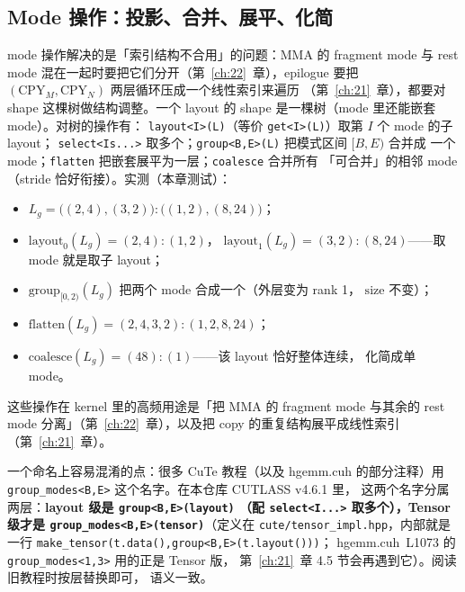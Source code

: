 \subsection{Mode 操作：投影、合并、展平、化简}

mode 操作解决的是「索引结构不合用」的问题：MMA 的 fragment mode 与 rest
mode 混在一起时要把它们分开（第~\ref{ch:22}~章），epilogue 要把
$(\mathrm{CPY}_M,\mathrm{CPY}_N)$ 两层循环压成一个线性索引来遍历
（第~\ref{ch:21}~章），都要对 shape 这棵树做结构调整。一个 layout 的 shape
是一棵树（mode 里还能嵌套 mode）。对树的操作有：
\texttt{layout\allowbreak{}<I>\allowbreak{}(L)}（等价 \texttt{get<I>(L)}）取第 $I$ 个 mode 的子 layout；
\texttt{select\allowbreak{}<Is.\allowbreak{}.\allowbreak{}.\allowbreak{}>} 取多个；\texttt{group\allowbreak{}<B,\allowbreak{}E>\allowbreak{}(L)} 把模式区间 $[B,E)$ 合并成
一个 mode；\texttt{flatten} 把嵌套展平为一层；\texttt{coalesce} 合并所有
「可合并」的相邻 mode（stride 恰好衔接）。实测（本章测试）：
\begin{itemize}
  \item $L_g = \bigl((2,4),(3,2)\bigr){:}\bigl((1,2),(8,24)\bigr)$；
  \item $\mathrm{layout}_0(L_g) = (2,4){:}(1,2)$，
        $\mathrm{layout}_1(L_g) = (3,2){:}(8,24)$——取 mode 就是取子 layout；
  \item $\mathrm{group}_{[0,2)}(L_g)$ 把两个 mode 合成一个（外层变为 rank 1，
        $\mathrm{size}$ 不变）；
  \item $\mathrm{flatten}(L_g) = (2,4,3,2){:}(1,2,8,24)$；
  \item $\mathrm{coalesce}(L_g) = (48){:}(1)$——该 layout 恰好整体连续，
        化简成单 mode。
\end{itemize}
这些操作在 kernel 里的高频用途是「把 MMA 的 fragment mode 与其余的 rest mode
分离」（第~\ref{ch:22}~章），以及把 copy 的重复结构展平成线性索引
（第~\ref{ch:21}~章）。

\begin{sloppypar}
一个命名上容易混淆的点：很多 CuTe 教程（以及 hgemm.cuh 的部分注释）用
\texttt{group\_\allowbreak{}modes\allowbreak{}<B,\allowbreak{}E>} 这个名字。在本仓库 CUTLASS v4.6.1 里，
这两个名字分属两层：\textbf{layout 级是 \texttt{group\allowbreak{}<B,\allowbreak{}E>\allowbreak{}(layout)}
（配 \texttt{select\allowbreak{}<I.\allowbreak{}.\allowbreak{}.\allowbreak{}>} 取多个），Tensor 级才是
\texttt{group\_\allowbreak{}modes\allowbreak{}<B,\allowbreak{}E>}\allowbreak\texttt{(tensor)}}（定义在
\texttt{cute/\allowbreak{}tensor\_\allowbreak{}impl.\allowbreak{}hpp}，内部就是一行
\texttt{make\_\allowbreak{}tensor\allowbreak{}(t.\allowbreak{}data\allowbreak{}(),\allowbreak{}}\allowbreak\texttt{group\allowbreak{}<B,\allowbreak{}E>\allowbreak{}(t.\allowbreak{}layout\allowbreak{}()))}；
hgemm.cuh~L1073 的 \texttt{group\_\allowbreak{}modes\allowbreak{}<1,\allowbreak{}3>} 用的正是 Tensor 版，
第~\ref{ch:21}~章 4.5 节会再遇到它）。阅读旧教程时按层替换即可，
语义一致。
\end{sloppypar}

